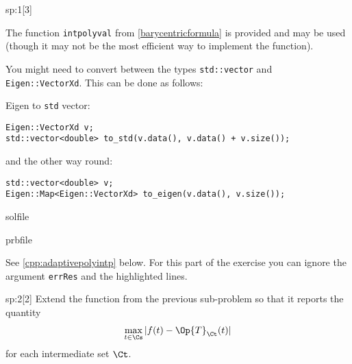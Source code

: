 \begin{samproblem}
\begin{subproblem}{sp:1}[3]
  \begin{samhint}
    The function \texttt{intpolyval} from \cref{barycentricformula}
    is provided and may be used (though it may not be the most efficient way
    to implement the function).
  \end{samhint}

  \begin{samhint}
    You might need to convert between the types \texttt{std::vector} and \texttt{Eigen::VectorXd}.
    This can be done as follows:

    Eigen to \texttt{std} vector:
    \begin{lstlisting}[style=cpp]
Eigen::VectorXd v;
std::vector<double> to_std(v.data(), v.data() + v.size());
    \end{lstlisting}
    and the other way round:
    \begin{lstlisting}[style=cpp]
std::vector<double> v;
Eigen::Map<Eigen::VectorXd> to_eigen(v.data(), v.size());
    \end{lstlisting}
  \end{samhint}


  \begin{samwriteprbpart}{solfile}
    \begin{writeverbatim}{prbfile}
      \begin{samsolution}
        See \cref{cpp:adaptivepolyintp} below.
        For this part of the exercise you can ignore the argument \texttt{errRes} and the highlighted lines.
     \end{samsolution}
    \end{writeverbatim}
  \end{samwriteprbpart}

\end{subproblem}


\begin{subproblem}{sp:2}[2]
  Extend the function from the previous sub-problem so that it reports the quantity 
  \begin{gather}\label{AIP:1}
    \operatorname*{max}\limits_{t\in\Cs}
    |f(t)-\Op{T}_{\Ct}(t)| %
  \end{gather}
  for each intermediate set $\Ct$. 


\end{subproblem}
\end{samproblem}
